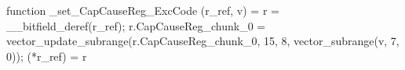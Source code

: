function _set_CapCauseReg_ExcCode (r_ref, v) = {
    r = __bitfield_deref(r_ref);
    r.CapCauseReg_chunk_0 = vector_update_subrange(r.CapCauseReg_chunk_0, 15, 8, vector_subrange(v, 7, 0));
    (*r_ref) = r
}
